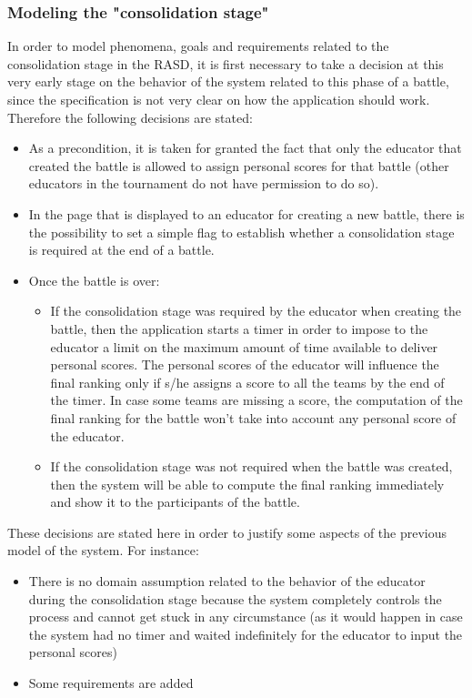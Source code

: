 	\subsubsection{Modeling the "consolidation stage"}
	In order to model phenomena, goals and requirements related to the consolidation stage in the RASD, it is first necessary to take a decision at this very early stage on the behavior of the system related to this phase of a battle, since the specification is not very clear on how the application should work. Therefore the following decisions are stated:
	\begin{itemize}
		\item As a precondition, it is taken for granted the fact that only the educator that created the battle is allowed to assign personal scores for that battle (other educators in the tournament do not have permission to do so).
		\item In the page that is displayed to an educator for creating a new battle, there is the possibility to set a simple flag to establish whether a consolidation stage is required at the end of a battle.
		\item Once the battle is over:
			\begin{itemize}
				\item If the consolidation stage was required by the educator when creating the battle, then the application starts a timer in order to impose to the educator a limit on the maximum amount of time available to deliver personal scores. The personal scores of the educator will influence the final ranking only if s/he assigns a score to all the teams by the end of the timer. In case some teams are missing a score, the computation of the final ranking for the battle won't take into account any personal score of the educator.
				\item If the consolidation stage was not required when the battle was created, then the system will be able to compute the final ranking immediately and show it to the participants of the battle.
			\end{itemize}
	\end{itemize}
	These decisions are stated here in order to justify some aspects of the previous model of the system. For instance:
	\begin{itemize}
		\item There is no domain assumption related to the behavior of the educator during the consolidation stage because the system completely controls the process and cannot get stuck in any circumstance (as it would happen in case the system had no timer and waited indefinitely for the educator to input the personal scores)
		\item Some requirements are added 
	\end{itemize}
	